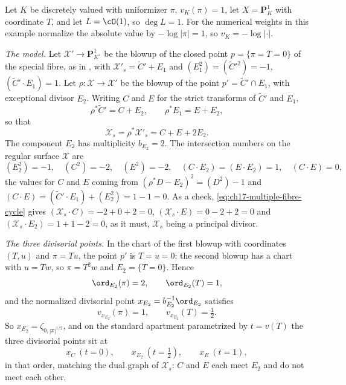 \begin{example}
\label{ex:ch17-multiple-fibre}
Let $K$ be discretely valued with uniformizer $\pi$, $v_K(\pi)=1$, let
$X=\mathbf P^1_K$ with coordinate $T$, and let $L=\cO(1)$, so
$\deg L=1$.  For the numerical weights in this example normalize the
absolute value by $-\log|\pi|=1$, so $v_K=-\log|\cdot|$.

\emph{The model.}  Let $\mathcal X'\to\mathbf P^1_{K^\circ}$ be the blowup
of the closed point $p=\{\pi=T=0\}$ of the special fibre, as in
, with
$\mathcal X'_s=\widetilde C'+E_1$ and
$(E_1^2)=(\widetilde C'^2)=-1$, $(\widetilde C'\cdot E_1)=1$.  Let
$\rho:\mathcal X\to\mathcal X'$ be the blowup of the point
$p'=\widetilde C'\cap E_1$, with exceptional divisor $E_2$.  Writing
$C$ and $E$ for the strict transforms of $\widetilde C'$ and $E_1$,
\[
 \rho^*\widetilde C'=C+E_2,\qquad \rho^*E_1=E+E_2,
\]
so that
\begin{equation}
\label{eq:ch17-multiple-fibre-cycle}
 \mathcal X_s=\rho^*\mathcal X'_s=C+E+2E_2 .
\end{equation}
The component $E_2$ has multiplicity $b_{E_2}=2$.  The intersection
numbers on the regular surface $\mathcal X$ are
\[
 (E_2^2)=-1,\quad (C^2)=-2,\quad (E^2)=-2,\quad
 (C\cdot E_2)=(E\cdot E_2)=1,\quad (C\cdot E)=0,
\]
the values for $C$ and $E$ coming from
$(\rho^*D-E_2)^2=(D^2)-1$ and
$(C\cdot E)=(\widetilde C'\cdot E_1)+(E_2^2)=1-1=0$.  As a check,
\eqref{eq:ch17-multiple-fibre-cycle} gives
$(\mathcal X_s\cdot C)=-2+0+2=0$,
$(\mathcal X_s\cdot E)=0-2+2=0$ and
$(\mathcal X_s\cdot E_2)=1+1-2=0$, as it must, $\mathcal X_s$ being a
principal divisor.

\emph{The three divisorial points.}  In the chart of the first blowup with
coordinates $(T,u)$ and $\pi=Tu$, the point $p'$ is $T=u=0$; the
second blowup has a chart with $u=Tw$, so $\pi=T^2w$ and
$E_2=\{T=0\}$.  Hence
\[
 \ord_{E_2}(\pi)=2,\qquad \ord_{E_2}(T)=1,
\]
and the normalized divisorial point $x_{E_2}=b_{E_2}^{-1}\ord_{E_2}$
satisfies
\[
 v_{x_{E_2}}(\pi)=1,\qquad v_{x_{E_2}}(T)=\tfrac12 .
\]
So $x_{E_2}=\zeta_{0,|\pi|^{1/2}}$, and on the standard apartment
parametrized by $t=v(T)$ the three divisorial points sit at
\[
 x_C\ (t=0),\qquad x_{E_2}\ (t=\tfrac12),\qquad x_E\ (t=1),
\]
in that order, matching the dual graph of $\mathcal X_s$: $C$ and $E$
each meet $E_2$ and do not meet each other.


\end{example}
